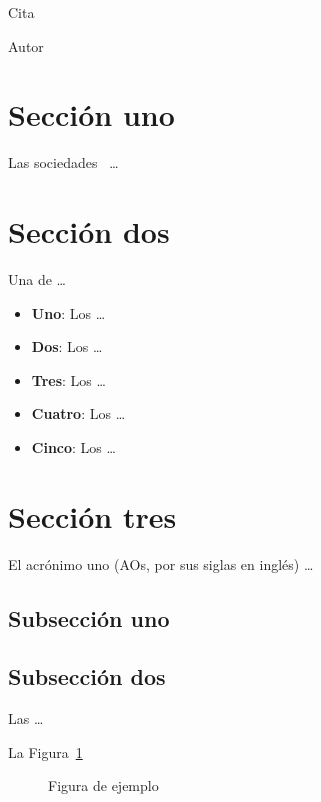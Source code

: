 \epigraph{Cita}{Autor}

\section{Sección uno}\label{seccion:SeccionUnoCapituloUno}

Las sociedades~\cite{citaEjemplo23} \dots
	
\section{Sección dos}\label{seccion:SeccionDosCapituloUno}

Una de \dots

\begin{itemize}
	\item \textbf{Uno}: Los \dots
	\item \textbf{Dos}: Los \dots
	\item \textbf{Tres}: Los \dots
	\item \textbf{Cuatro}: Los \dots
	\item \textbf{Cinco}: Los \dots
\end{itemize}

\section{Sección tres}\label{seccion:SeccionTresCapituloUno}

El acrónimo uno (\acsp{AO}, por sus siglas en inglés) \dots

\subsection{Subsección uno}\label{subsection:SubseccionUnoSeccionTresCapituloUno} 

\subsection{Subsección dos}\label{subseccion:SubseccionDosSeccionTresCapituloUno}

Las \dots

La Figura~\ref{figura:EjemploUno}
\begin{figure}[!ht]
	\centering
	
	\caption{Figura de ejemplo}
	\label{figura:EjemploUno}
\end{figure}

\iffalse %
\begin{itemize}
	\item \textbf{Ejemplo uno}:  
	\item \textbf{Ejemplo dos}: 
	\item \textbf{Ejemplo tres}: 
\end{itemize}
\fi

